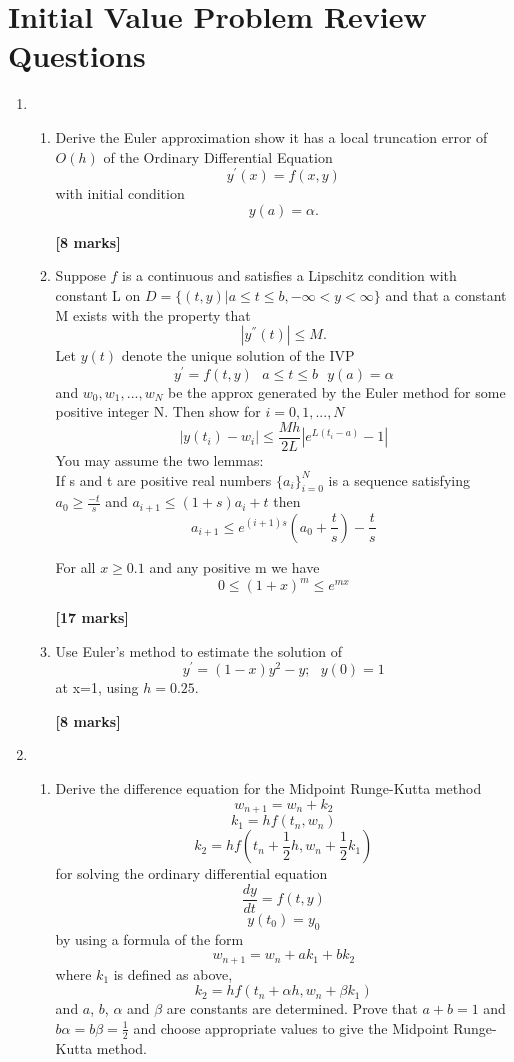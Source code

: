 
\section{Initial Value Problem Review Questions}
\begin{enumerate}
\item
\begin{enumerate}
\item
Derive the Euler approximation show it has a local truncation error of $O(h)$ of the Ordinary Differential Equation
\[y^{'}(x)=f(x,y) \]
with initial condition
\[y(a)=\alpha. \]
\begin{flushright}
\textbf{[8 marks]}
\end{flushright}
\item 
 Suppose $f$ is a continuous and satisfies a Lipschitz condition with constant
L on $D=\{(t,y)|a\leq t \leq b, -\infty < y < \infty \}$ and that a constant M
exists with the property that 
\[ |y^{''}(t)|\leq M. \]
Let $y(t)$ denote the unique solution of the IVP
\[ y^{'}=f(t,y) \ \ \ a\leq t \leq b \ \ \ y(a)=\alpha \]
and $w_0,w_1,...,w_N$ be the approx generated by the Euler method for some
positive integer N.  Then show for $i=0,1,...,N$
\[ |y(t_i)-w_i| \leq \frac{Mh}{2L}|e^{L(t_i-a)}-1| \]
You may assume the two lemmas:\\
If s and t are positive real numbers $\{a_i\}_{i=0}^{N}$ is a sequence satisfying $a_0 \geq \frac{-t}{s}$ and $a_{i+1} \leq (1+s)a_i +t $
then
\[a_{i+1} \leq e^{(i+1)s}\left(a_0+\frac{t}{s}\right)-\frac{t}{s} \]

For all $ x \geq 0.1$ and any positive m we have \[0\leq (1+x)^m \leq e^{mx}\]
\begin{flushright}
\textbf{[17 marks]}
\end{flushright}
\item
Use Euler's method to estimate the solution of
\[ y^{'}=(1-x)y^2-y; \ \ \ y(0)=1 \]
at x=1, using $h=0.25$.
\begin{flushright}
\textbf{[8 marks]}
\end{flushright}

\end{enumerate}
\item
\begin{enumerate}
\item
Derive the difference equation for the Midpoint Runge-Kutta method\\
\[ w_{n+1}=w_n+k_2\]
\[k_1=hf(t_n,w_n)\]
\[k_2=hf(t_n+\frac{1}{2}h,w_n+\frac{1}{2}k_1)\]
for solving the ordinary differential equation
\[ \frac{dy}{dt}=f(t,y) \]
\[y(t_0)=y_0 \]
by using a formula of the form
\[w_{n+1}=w_n+ak_1+bk_2 \]
where $k_1$ is defined as above,
\[k_2=hf(t_n+\alpha h,w_n+\beta k_1)\]
and $a$, $b$, $\alpha$ and $\beta$ are constants are determined. Prove that $a+b=1$ and $b\alpha=b\beta=\frac{1}{2}$ and choose appropriate values to give the Midpoint Runge-Kutta method.


\end{enumerate}
\end{enumerate}

